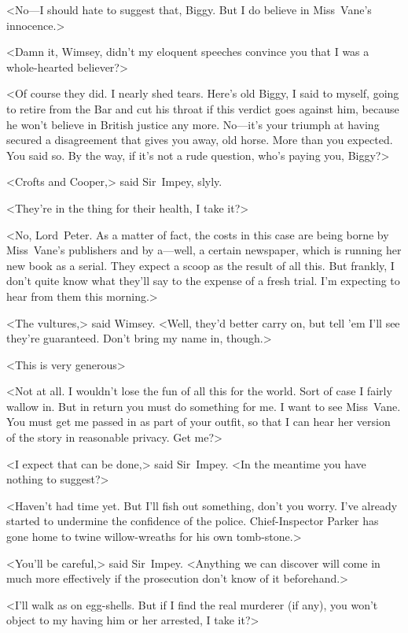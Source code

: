 <No—I should hate to suggest that, Biggy. But I do believe in Miss~Vane's innocence.>

<Damn it, Wimsey, didn't my eloquent speeches convince you that I was a whole-hearted believer?>

<Of course they did. I nearly shed tears. Here's old Biggy, I said to myself, going to retire from the Bar and cut his throat if this verdict goes against him, because he won't believe in British justice any more. No—it's your triumph at having secured a disagreement that gives you away, old horse. More than you expected. You said so. By the way, if it's not a rude question, who's paying you, Biggy?>

<Crofts and Cooper,> said Sir~Impey, slyly.

<They're in the thing for their health, I take it?>

<No, Lord~Peter. As a matter of fact, the costs in this case are being borne by Miss~Vane's publishers and by a—well, a certain newspaper, which is running her new book as a serial. They expect a scoop as the result of all this. But frankly, I don't quite know what they'll say to the expense of a fresh trial. I'm expecting to hear from them this morning.>

<The vultures,> said Wimsey. <Well, they'd better carry on, but tell 'em I'll see they're guaranteed. Don't bring my name in, though.>

<This is very generous\longdash>

<Not at all. I wouldn't lose the fun of all this for the world. Sort of case I fairly wallow in. But in return you must do something for me. I want to see Miss~Vane. You must get me passed in as part of your outfit, so that I can hear her version of the story in reasonable privacy. Get me?>

<I expect that can be done,> said Sir~Impey. <In the meantime you have nothing to suggest?>

<Haven't had time yet. But I'll fish out something, don't you worry. I've already started to undermine the confidence of the police. Chief-Inspector Parker has gone home to twine willow-wreaths for his own tomb-stone.>

<You'll be careful,> said Sir~Impey. <Anything we can discover will come in much more effectively if the prosecution don't know of it beforehand.>

<I'll walk as on egg-shells. But if I find the real murderer (if any), you won't object to my having him or her arrested, I take it?>

